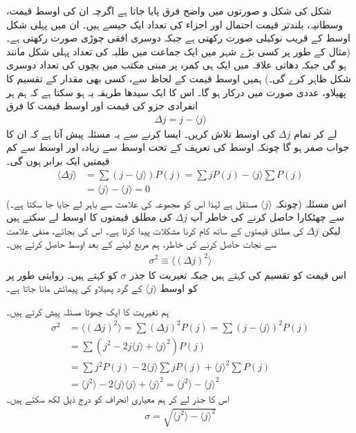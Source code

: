 شکل  کی شکل و صورتوں میں واضح فرق پایا جاتا ہے اگرچہ ان کی اوسط قیمت، وسطانیہ، بلندتر قیمت احتمال اور اجزاء کی تعداد ایک جیسے ہیں۔ ان میں پہلی شکل اوسط کے قریب نوکیلی صورت رکھتی ہے جبکہ دوسری افقی چوڑی  صورت رکھتی ہے۔ (مثال کے طور پر کسی بڑے شہر میں ایک جماعت میں طلبہ  کی تعداد پہلی شکل  مانند ہو گی جبکہ دھاتی علاقہ  میں ایک ہی کمرہ پر مبنی مکتب  میں بچوں کی تعداد دوسری شکل ظاہر کرے گی۔) ہمیں اوسط قیمت کے لحاظ سے، کسی بھی مقدار کے تقسیم کا پھیلاو، عددی صورت میں درکار ہو گا۔ اس کا ایک سیدھا طریقہ یہ ہو سکتا ہے کہ ہم ہر انفرادی جزو کی قیمت اور اوسط قیمت کا فرق
\begin{align}
\Delta j = j-\langle j \rangle 
\end{align}
لے کر  تمام \( \Delta j \) کی اوسط تلاش کریں۔ ایسا کرنے سے یہ مسئلہ پیش آتا ہے کہ ان کا جواب صفر ہو گا چونکہ اوسط کی تعریف کے تحت اوسط سے زیادہ اور اوسط سے کم قیمتیں ایک برابر ہوں گی۔ 
\begin{align*}
\langle \Delta j \rangle &= \sum \left( j -  \langle j \rangle  \right) P(j) = \sum jP(j) - \langle j \rangle \sum P(j) \\
 &= \langle j \rangle - \langle j \rangle = 0
\end{align*}
(چونکہ \( \langle j \rangle \)   مستقل ہے لہٰذا اس کو مجموعہ کی علامت سے باہر لے جایا جا سکتا ہے۔) اس مسئلہ سے چھٹکارا حاصل کرنے کی خاطر  آپ  \( \Delta j \)    کی مطلق قیمتوں کا اوسط لے سکتے ہیں لیکن \( \Delta j \)    کی مطلق قیمتوں  کے ساتھ کام کرنا مشکلات پیدا کرتا ہے۔ اس کی بجائے، منفی علامت سے نجات حاصل کرنے کی خاطر، ہم مربع لینے کے بعد اوسط حاصل کرتے ہیں۔
\begin{align} \label{مساوات_تفاعل_موج_تعریف_معیاری_احتمال_الف}
 \sigma^{2} \equiv \langle \left( \Delta j \right)^{2} \rangle 
\end{align}
اس قیمت کو تقسیم کی  کہتے ہیں جبکہ تغیریت کا جذر \( \sigma \)  کو  کہتے ہیں۔ روایتی طور پر   کو اوسط  \( \langle j \rangle \) کے گرد پھیلاو کی پیمائش  مانا جاتا ہے۔

 ہم تغیریت کا ایک چھوٹا مسئلہ پیش کرتے ہیں۔ 
\begin{align*}
\sigma^{2} &= \langle ( \Delta j )^{2} \rangle = \sum ( \Delta j )^{2} P(j) = \sum (j- \langle j \rangle )^{2} P(j) \\
&= \sum (j^{2} -2j \langle j \rangle + \langle j \rangle ^{2} ) P(j) \\ 
&= \sum j^{2} P(j) -2 \langle j \rangle \sum jP(j) + \langle j \rangle ^{2} \sum P(j) \\ 
&= \langle j^{2}\rangle -2\langle j \rangle \langle j \rangle + \langle j \rangle ^{2} = \langle j^{2} \rangle - \langle j \rangle ^{2}
\end{align*}
اس کا جذر لے کر ہم معیاری انحراف کو درج ذیل لکھ سکتے ہیں۔ 
\begin{align}\label{مساوات_تفاعل_موج_تعریف_معیاری_احتمال_ب}
 \sigma = \sqrt{\langle j^{2} \rangle - \langle j \rangle ^{2}} 
\end{align}


